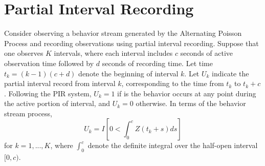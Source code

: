 \documentclass[man, noextraspace, floatsintext]{apa6}\usepackage[]{graphicx}\usepackage[]{color}
\begin{document}
\section{Partial Interval Recording}
\label{sec:PIR}

Consider observing a behavior stream generated by the Alternating Poisson Process and recording observations using partial interval recording. Suppose that one observes $K$ intervals, where each interval includes $c$ seconds of active observation time followed by $d$ seconds of recording time. Let time $t_k = (k-1)(c + d)$ denote the beginning of interval $k$. Let $U_k$ indicate the partial interval record from interval $k$, corresponding to the time from $t_k$ to $t_k + c$. Following the PIR system, $U_k = 1$ if is the behavior occurs at any point during the active portion of interval, and $U_k = 0$ otherwise. In terms of the behavior stream process, 
\begin{equation}
U_k = I\left[ 0 < \int_0^c Z\left(t_k + s \right) ds\right]
\end{equation}
for $k = 1,...,K$, where $\int_0^c$ denote the definite integral over the half-open interval $[0,c)$.
\end{document}
